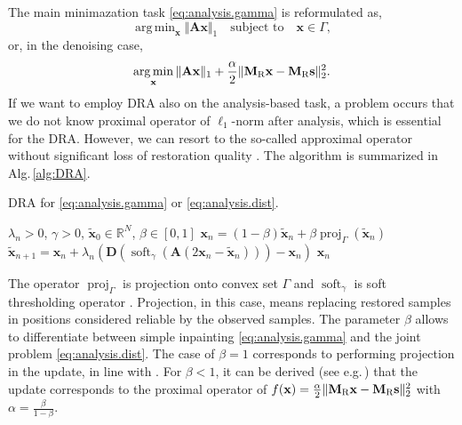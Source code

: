 \documentclass[conference]{IEEEtran}
\begin{document}
The main minimazation task \eqref{eq:analysis.gamma} is reformulated as,
\begin{equation}
	\label{eq:analysis.gamma}
	\mathop {\operatorname{arg \, min}}_\mathbf {x}\Vert \mathbf{A} \mathbf {x}\Vert _1 \quad \text{subject to}\quad \mathbf {x}\in \Gamma,
\end{equation}
or, in the denoising case,
\begin{equation}
	\label{eq:analysis.dist}
	\mathop {\operatorname{arg \, min}}_\mathbf {x}\Vert \mathbf{A} \mathbf {x}\Vert _1 + \frac{\alpha}{2} \Vert \mathbf{M}_{\textup{R}} \mathbf {x} - \mathbf{M}_{\textup{R}} \mathbf{s} \Vert^2_2.
\end{equation} 
If we want to employ DRA also on the analysis-based task, a problem occurs
that we do not know proximal operator of $ \ell_1 $-norm after analysis, which is essential for the DRA.
However, we can resort to the so-called approximal operator without significant loss of restoration quality \cite{Mokry2021}.
The algorithm is summarized in Alg.\,\ref{alg:DRA}.

\vspace{-1.5ex} 
\begin{algorithm}
	\caption{DRA for \eqref{eq:analysis.gamma} or \eqref{eq:analysis.dist}.}
	\begin{algorithmic}[1]\label{alg:DRA}
		\renewcommand{\algorithmicrequire}{\textbf{Input:}}
		\renewcommand{\algorithmicensure}{\textbf{Output:}}
		\REQUIRE $ \lambda_n > 0 $, $ \gamma>0 $, $ \mathbf{\widetilde{x}}_0 \in \mathbb{R}^{N} $, $\beta \in [0, 1]$
		\STATE $\mathbf{x}_n= (1-\beta)\mathbf{\widetilde{x}}_n + \beta \operatorname{proj}_{\Gamma}(\mathbf{\widetilde{x}}_n) $ 
		\STATE $ \mathbf{\widetilde{x}}_{n+1} = \mathbf{x}_n + \lambda_n \left( \mathbf{D}\left(\operatorname{soft}_{\gamma}\left(\mathbf{A}\left(2\mathbf{x}_n-\mathbf{\widetilde{x}}_n\right) \right)\right) -\mathbf{x}_n\right)$
		\ENDFOR
		\RETURN $\mathbf{x}_n$
	\end{algorithmic} 
\end{algorithm}
\vspace{-1.5ex} 

The operator $ \operatorname{proj}_{\Gamma}$ is projection onto convex set $ \Gamma $ and $\operatorname{soft}_{\gamma}$ is soft thresholding operator \cite{Combettes2011}.
Projection, in this case, means replacing restored samples in positions considered reliable by the observed samples.
The parameter $\beta$ allows to differentiate between simple inpainting \eqref{eq:analysis.gamma} and the joint problem \eqref{eq:analysis.dist}.
The case of $\beta = 1$ corresponds to performing projection in the update, in line with \cite{Mokry2020}.
For $\beta < 1$, it can be derived (see e.g.\,\cite[Sec.\,4 and Tab.\,1]{Combettes2011}) that the update corresponds to the proximal operator of $f(\mathbf{x}) = \frac{\alpha}{2} \Vert \mathbf{M}_{\textup{R}} \mathbf {x} - \mathbf{M}_{\textup{R}} \mathbf{s} \Vert^2_2$ with $\alpha = \frac{\beta}{1-\beta}$.
\end{document}
